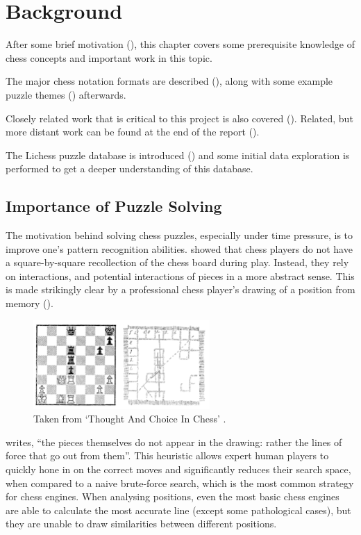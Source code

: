 \chapter{Background}\label{backgroundChapter}

After some brief motivation (), this chapter covers some prerequisite
knowledge of chess concepts and important work in this topic.

The major chess notation formats are described (), along with some
example puzzle themes () afterwards.

Closely related work that is critical to this project is also covered
(). Related, but more distant work can be found at the end of the
report ().

The Lichess puzzle database is introduced () and some initial data
exploration is performed to get a deeper understanding of this database.

\section{Importance of Puzzle Solving}\label{bg1}

The motivation behind solving chess puzzles, especially under time pressure, is
to improve one's pattern recognition abilities. \citet{thoughtAndChoice} showed
that chess players do not have a square-by-square recollection of the chess
board during play. Instead, they rely on interactions, and potential
interactions of pieces in a more abstract sense. This is made strikingly clear
by a professional chess player's drawing of a position from memory
().

\begin{figure}[H]
  \centering
  \includegraphics[width=0.6\textwidth]{background/img/deGroot.png}
  \caption{Taken from `Thought And Choice In Chess'
  \citep{thoughtAndChoice}.}
  \label{deGrootFigure}
\end{figure}

\citet{thoughtAndChoice} writes, ``the pieces themselves do not appear in the
drawing: rather the lines of force that go out from them''. This heuristic
allows expert human players to quickly hone in on the correct moves
\citep{bilalic2010mechanisms} and significantly reduces their search space,
when compared to a naive brute-force search, which is the most common strategy
for chess engines. When analysing positions, even the most basic chess engines
are able to calculate the most accurate line (except some pathological cases),
but they are unable to draw similarities between different positions.

